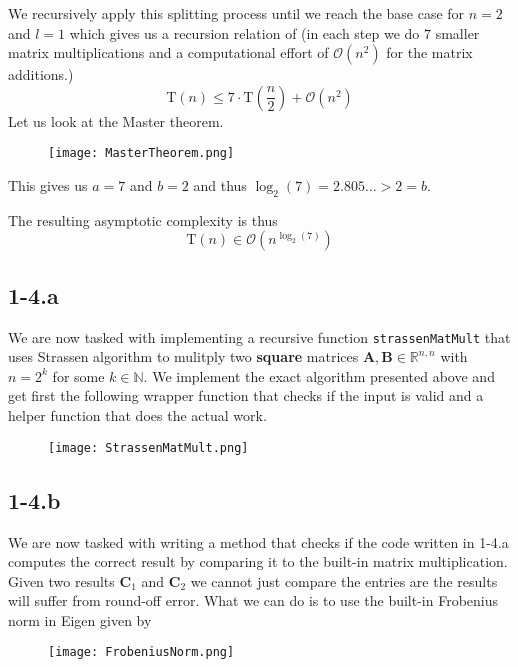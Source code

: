 \documentclass{article}
\begin{document}
We recursively apply this splitting process until we reach the base case for $n = 2$ and $l=1$ which gives us a recursion relation of (in each step we do $7$ smaller matrix multiplications and a computational effort of $\mathcal{O}\left(n^{2}\right)$ for the matrix additions.)
\begin{equation*}
    \mathrm{T}\left(n \right) \leq 7\cdot\mathrm{T}\left(\frac{n}{2}\right) + \mathcal{O}\left(n^{2}\right)
\end{equation*}
Let us look at the Master theorem.
 \begin{figure}[!hbt]
    \centering
\texttt{[image: MasterTheorem.png]}
\end{figure}

\noindent This gives us $a = 7$ and $b = 2$ and thus $\log_{2}\left(7\right) = 2.805\dots > 2 = b$.

\pagebreak 


\noindent The resulting asymptotic complexity is thus  
\begin{equation*}
    \mathrm{T}\left(n\right) \in \mathcal{O}\left(n^{\log_{2}\left(7\right)}\right)
\end{equation*}
\subsection*{1-4.a}
We are now tasked with implementing a recursive function \verb|strassenMatMult| that uses Strassen algorithm to mulitply two \textbf{square} matrices $\mathbf{A}, \mathbf{B} \in \mathbb{R}^{n,n}$ with $n = 2^{k}$ for some $k \in \mathbb{N}$. We implement the exact algorithm presented above and get first the following wrapper function that checks if the input is valid and a helper function that does the actual work.

 \begin{figure}[!hbt]
    \centering
\texttt{[image: StrassenMatMult.png]}
\end{figure}

\subsection*{1-4.b}
We are now tasked with writing a method that checks if the code written in 1-4.a computes the correct result by comparing it to the built-in matrix multiplication. Given two results $\mathbf{C}_{1}$ and $\mathbf{C}_{2}$ we cannot just compare the entries are the results will suffer from round-off error. What we can do is to use the built-in Frobenius norm in Eigen given by
\begin{figure}[!hbt]
    \centering
\texttt{[image: FrobeniusNorm.png]}
\end{figure}
\end{document}
